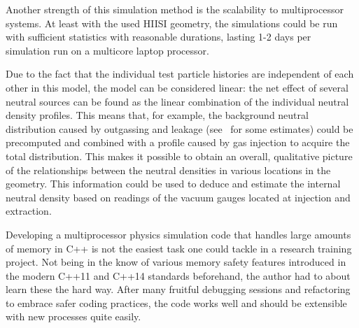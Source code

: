 \documentclass[a4paper,twoside,12pt]{article}
\begin{document}
Another strength of this simulation method is the scalability to multiprocessor
systems. At least with the used HIISI geometry, the simulations could be run
with sufficient statistics with reasonable durations, lasting 1-2 days per
simulation run on a multicore laptop processor.

Due to the fact that the individual test particle histories are independent of
each other in this model, the model can be considered linear: the net effect of
several neutral sources can be found as the linear combination of the
individual neutral density profiles. This means that, for example, the
background neutral
distribution caused by outgassing and leakage (see~\cite{kapanen:bsc} for some
estimates) could be
precomputed and combined with a profile caused by gas injection to acquire the
total distribution. This makes it possible to obtain an overall, qualitative
picture of the relationships between the neutral densities in various locations in the
geometry. This information could be used to deduce and estimate the internal
neutral density based on readings of the vacuum gauges located at injection and
extraction.

Developing a multiprocessor physics simulation code that handles
large amounts of memory in \textsc{C++} is not the easiest task one could tackle
in a research training project. Not being in the know of various
memory safety features introduced in the modern \textsc{C++11} and
\textsc{C++14} standards beforehand, the author had to about learn these the hard way.
After many fruitful debugging sessions and refactoring to embrace safer
coding practices, the code works well and should be extensible with
new processes quite easily.

\clearpage



\end{document}

